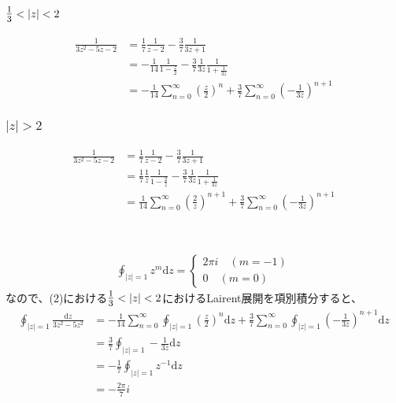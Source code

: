 \documentclass[dvipdfmx,a4paper]{jsarticle}
\begin{document}
\subsubsection{$\mbox{\large$\frac{1}{3}$} < |z| < 2$}
\begin{align*}
\frac{1}{3z^2 - 5z -2} &= \frac{1}{7}\frac{1}{z-2} - \frac{3}{7}\frac{1}{3z+1}\\
&= -\frac{1}{14}\frac{1}{1 - \frac{z}{2}} - \frac{3}{7}\frac{1}{3z}\frac{1}{1 + \frac{1}{3z}}\\
&=-\frac{1}{14}\sum_{n = 0}^{\infty}(\frac{z}{2})^n + \frac{3}{7}\sum_{n = 0}^{\infty}(-\frac{1}{3z})^{n+1}
\end{align*}

\subsubsection{$|z| > 2$}
\begin{align*}
\frac{1}{3z^2 - 5z -2} &= \frac{1}{7}\frac{1}{z-2} - \frac{3}{7}\frac{1}{3z+1}\\
&= \frac{1}{7}\frac{1}{z}\frac{1}{1 - \frac{2}{z}} - \frac{3}{7}\frac{1}{3z}\frac{1}{1 + \frac{1}{3z}}\\
&=\frac{1}{14}\sum_{n = 0}^{\infty}(\frac{2}{z})^{n+1} + \frac{3}{7}\sum_{n = 0}^{\infty}(-\frac{1}{3z})^{n+1}
\end{align*}
\\

\subsection{}
\begin{align*}
\oint_{|z| = 1}z^m\mathrm{d}z = \begin{cases}
2\pi i\quad(m=-1)\\
0\quad(m=0)
\end{cases}
\end{align*}
なので、(2)における$\mbox{\large$\frac{1}{3}$} < |z| < 2$におけるLairent展開を項別積分すると、
\begin{align*}
\oint_{|z| =1}\frac{\mathrm{d}z}{3z^2-5z^2} &= -\frac{1}{14}\sum_{n = 0}^{\infty}\oint_{|z| = 1}(\frac{z}{2})^n\mathrm{d}z  + \frac{3}{7}\sum_{n = 0}^{\infty}\oint_{|z| = 1}(-\frac{1}{3z})^{n+1}\mathrm{d}z \\
&=  \frac{3}{7}\oint_{|z| = 1}-\frac{1}{3z}\mathrm{d}z\\
&= -\frac{1}{7}\oint_{|z| = 1}z^{-1}\mathrm{d}z\\
&= -\frac{2\pi}{7}i
\end{align*}
\end{document}
